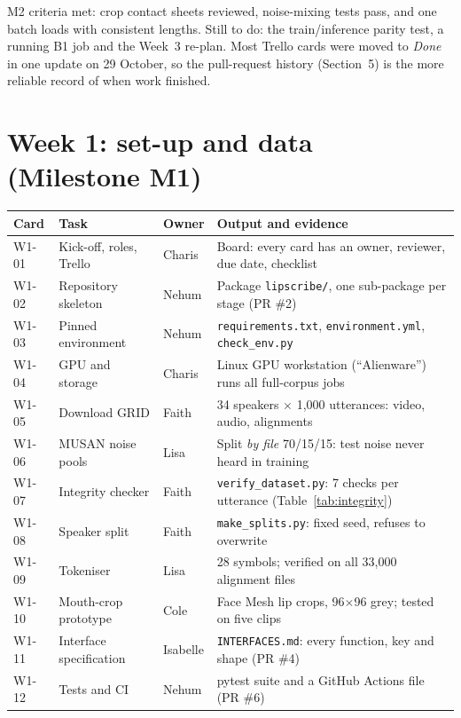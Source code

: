 \documentclass[11pt,a4paper]{article}
\newcommand{\code}[1]{\texttt{\small #1}}
\begin{document}
\medskip
M2 criteria met: crop contact sheets reviewed, noise-mixing tests pass, and one
batch loads with consistent lengths. Still to do: the train/inference parity
test, a running B1 job and the Week~3 re-plan. Most Trello cards were moved to
\emph{Done} in one update on 29 October, so the pull-request history
(Section~5) is the more reliable record of when work finished.

\section{Week 1: set-up and data (Milestone M1)}

{\small
{}
\begin{tabularx}{\textwidth}{@{}L{1.05cm}L{3.75cm}L{1.35cm}X@{}}
\toprule
{}\sffamily\bfseries Card & \sffamily\bfseries Task & \sffamily\bfseries Owner & \sffamily\bfseries Output and evidence \\
\midrule
W1-01 & Kick-off, roles, Trello & Charis & Board: every card has an owner, reviewer, due date, checklist \\
W1-02 & Repository skeleton & Nehum & Package \code{lipscribe/}, one sub-package per stage (PR \#2) \\
W1-03 & Pinned environment & Nehum & \code{requirements.txt}, \code{environment.yml}, \code{check\_env.py} \\
W1-04 & GPU and storage & Charis & Linux GPU workstation (``Alienware'') runs all full-corpus jobs \\
W1-05 & Download GRID & Faith & 34 speakers $\times$ 1,000 utterances: video, audio, alignments \\
W1-06 & MUSAN noise pools & Lisa & Split \emph{by file} 70/15/15: test noise never heard in training \\
W1-07 & Integrity checker & Faith & \code{verify\_dataset.py}: 7 checks per utterance (Table~\ref{tab:integrity}) \\
W1-08 & Speaker split & Faith & \code{make\_splits.py}: fixed seed, refuses to overwrite \\
W1-09 & Tokeniser & Lisa & 28 symbols; verified on all 33,000 alignment files \\
W1-10 & Mouth-crop prototype & Cole & Face Mesh lip crops, 96$\times$96 grey; tested on five clips \\
W1-11 & Interface specification & Isabelle & \code{INTERFACES.md}: every function, key and shape (PR \#4) \\
W1-12 & Tests and CI & Nehum & pytest suite and a GitHub Actions file (PR \#6) \\
\bottomrule
\end{tabularx}
}
\end{document}
